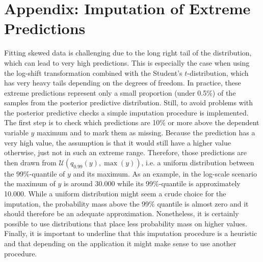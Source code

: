 \chapter{Appendix: Imputation of Extreme Predictions}
\label{ch:imputation}
Fitting skewed data is challenging due to the long right tail of the distribution, which can lead to very high predictions.
This is especially the case when using the log-shift transformation combined with the Student's $t$-distribution, which has very heavy tails depending on the degrees of freedom.
In practice, these extreme predictions represent only a small proportion (under 0.5\%) of the samples from the posterior predictive distribution.
Still, to avoid problems with the posterior predictive checks a simple imputation procedure is implemented.
The first step is to check which predictions are 10\% or more above the dependent variable $y$ maximum and to mark them as missing.
Because the prediction has a very high value, the assumption is that it would still have a higher value otherwise, just not in such an extreme range.
Therefore, those predictions are then drawn from $\mathcal U(q_{0.99}(y), \max(y))$, i.e. a uniform distribution between the 99\%-quantile of $y$ and its maximum.
As an example, in the log-scale scenario the maximum of $y$ is around 30.000 while its 99\%-quantile is approximately 10.000.
While a uniform distribution might seem a crude choice for the imputation, the probability mass above the 99\% quantile is almost zero and it should therefore be an adequate approximation.
Nonetheless, it is certainly possible to use distributions that place less probability mass on higher values.
Finally, it is important to underline that this imputation procedure is a heuristic and that depending on the application it might make sense to use another procedure.